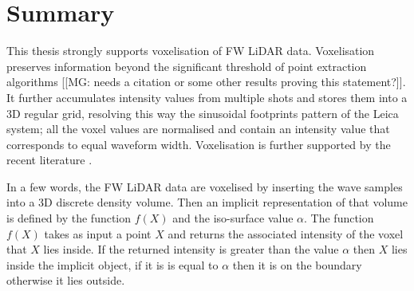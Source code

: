 \documentclass{subfiles}
\begin{document}
\section{Summary}
This thesis strongly supports voxelisation of FW LiDAR data. Voxelisation preserves information beyond the significant threshold of point extraction algorithms [[MG: needs a citation or some other results proving this statement?]]. It further accumulates intensity values from multiple shots and stores them into a 3D regular grid, resolving this way the sinusoidal footprints pattern of the Leica system; all the voxel values are normalised and contain an intensity value that corresponds to equal waveform width. Voxelisation is further supported by the recent literature \cite{Cao2016} \cite{Sumnall2016}. 

In a few words, the FW LiDAR data are voxelised by inserting the wave samples into a 3D discrete density volume. Then an implicit representation of that volume is defined by the function $f(X)$ and the iso-surface value $\alpha$. The function $f(X)$ takes as input a point $X$ and returns the associated intensity of the voxel that $X$ lies inside. If the returned intensity is greater than the value $\alpha$ then $X$ lies inside the implicit object, if it is is equal to $\alpha$ then it is on the boundary otherwise it lies outside. 
\end{document}
